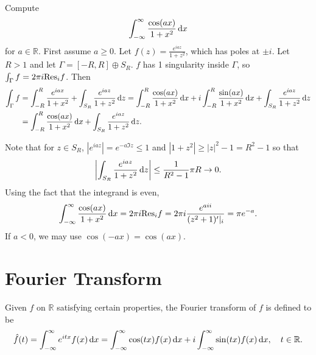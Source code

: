 \begin{xmpl}
Compute
$$
\int_{-\infty}^\infty
  \frac{\cos (a x)}{1 + x^2}
  \mathop{}\!\mathrm{d} x
$$
for $a \in \mathbb{R}$. First assume $a \geq 0$.
Let $f(z) = \frac{e^{iaz}}{1 + z^2}$, which has poles
at $\pm i$. Let $R > 1$ and let
$\Gamma = [-R, R] \oplus S_R$. $f$ has 1 singularity
inside $\Gamma$, so $\int_\Gamma f = 2 \pi i \mathrm{Res}_i f$.
Then
\begin{align*}
  \int_\Gamma f
&= \int_{-R}^{R}
     \frac{e^{i a x}}
          {1 + x^2}
 + \int_{S_R}
     \frac{e^{i a z}}{1 + z^2}
     \mathop{}\!\mathrm{d} z
 = \int_{-R}^{R}
     \frac{\cos(ax)}
          {1 + x^2}
     \mathop{}\!\mathrm{d} x
 + i
   \int_{-R}^{R}
     \frac{\sin(ax)}
          {1 + x^2}
     \mathop{}\!\mathrm{d} x
 + \int_{S_R}
     \frac{e^{i a z}}{1 + z^2}
     \mathop{}\!\mathrm{d} z \\
&= \int_{-R}^{R}
     \frac{\cos(ax)}
          {1 + x^2}
     \mathop{}\!\mathrm{d} x
 + \int_{S_R}
     \frac{e^{i a z}}{1 + z^2}
     \mathop{}\!\mathrm{d} z.
\end{align*}

Note that for $z \in S_R$,
$|e^{i a z}| = e^{-a \Im z} \leq 1$ and
$|1 + z^2| \geq |z|^2 - 1 = R^2 - 1$
so that
$$
  \left|
    \int_{S_R}
      \frac{e^{i a z}}{1 + z^2}
      \mathop{}\!\mathrm{d} z
  \right|
\leq \frac{1}{R^2 - 1} \pi R \to 0.
$$
Using the fact that the integrand is even,
$$
  \int_{-\infty}^\infty
    \frac{\cos(ax)}{1 + x^2}
    \mathop{}\!\mathrm{d} x
= 2 \pi i \mathrm{Res}_i f
= 2 \pi i \frac{e^{a i i}}{(z^2 + 1)^\prime|_i}
= \pi e^{-a}.
$$
If $a < 0$, we may use $\cos(-ax) = \cos (ax)$.
\end{xmpl}

\section{Fourier Transform}
Given $f$ on $\mathbb{R}$ satisfying certain properties,
the Fourier transform of $f$ is defined to be
$$
  \hat{f}(t)
= \int_{-\infty}^{\infty}
    e^{i t x} f(x) \mathop{}\!\mathrm{d} x
= \int_{-\infty}^\infty
    \cos(tx) f(x) \mathop{}\!\mathrm{d} x
+ i
  \int_{-\infty}^\infty
    \sin(tx) f(x) \mathop{}\!\mathrm{d} x, \quad t \in \mathbb{R}.
$$

